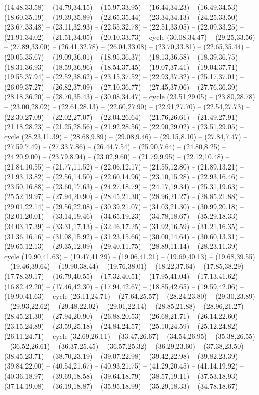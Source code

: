 {(14.48,33.58) -- (14.79,34.15) -- (15.97,33.95) -- (16.44,34.23) -- (16.49,34.53) -- (18.60,35.19) -- (19.39,35.89) -- (22.65,35.44) -- (23.34,34.13) -- (24.25,33.50) -- (23.67,33.48) -- (23.11,32.93) -- (22.55,32.78) -- (22.51,33.05) -- (22.09,33.25) -- (21.91,34.02) -- (21.51,34.05) -- (20.10,33.73) -- cycle (30.08,34.47) -- (29.25,33.56) -- (27.89,33.00) -- (26.41,32.78) -- (26.04,33.08) -- (23.70,33.81) -- (22.65,35.44) -- (20.05,35.67) -- (19.09,36.01) -- (18.95,36.37) -- (18.13,36.58) -- (18.39,36.75) -- (18.31,36.93) -- (18.59,36.96) -- (18.54,37.45) -- (19.07,37.41) -- (19.04,37.71) -- (19.55,37.94) -- (22.52,38.62) -- (23.15,37.52) -- (22.93,37.32) -- (25.17,37.01) -- (26.09,37.27) -- (26.82,37.09) -- (27.10,36.77) -- (27.45,37.06) -- (27.76,36.39) -- (28.18,36.20) -- (28.70,35.43) -- (30.08,34.47) -- cycle (23.51,29.05) -- (23.80,28.78) -- (23.00,28.02) -- (22.61,28.13) -- (22.60,27.90) -- (22.91,27.70) -- (22.54,27.73) -- (22.30,27.09) -- (22.02,27.07) -- (22.04,26.64) -- (21.76,26.61) -- (21.49,27.91) -- (21.18,28.23) -- (21.25,28.56) -- (21.92,28.56) -- (22.90,29.02) -- (23.51,29.05) -- cycle (28.23,11.39) -- (28.68,9.89) -- (29.08,9.46) -- (29.15,8.10) -- (27.84,7.47) -- (27.59,7.49) -- (27.33,7.86) -- (26.44,7.54) -- (25.90,7.64) -- (24.80,8.25) -- (24.20,9.00) -- (23.79,8.94) -- (23.02,9.60) -- (21.79,9.95) -- (22.12,10.48) -- (21.84,10.55) -- (21.77,11.52) -- (22.06,12.17) -- (21.55,12.80) -- (21.89,13.21) -- (21.93,13.82) -- (22.56,14.50) -- (22.60,14.96) -- (23.10,15.28) -- (22.93,16.46) -- (23.50,16.88) -- (23.60,17.63) -- (24.27,18.79) -- (24.17,19.34) -- (25.31,19.63) -- (25.52,19.97) -- (27.94,20.90) -- (28.45,21.30) -- (28.96,21.27) -- (28.85,21.88) -- (29.01,22.14) -- (29.56,22.08) -- (30.39,21.07) -- (31.03,21.30) -- (30.99,20.18) -- (32.01,20.01) -- (33.14,19.46) -- (34.65,19.23) -- (34.78,18.67) -- (35.29,18.33) -- (34.03,17.39) -- (33.31,17.13) -- (32.46,17.25) -- (31.92,16.59) -- (31.21,16.35) -- (31.36,16.16) -- (31.08,15.92) -- (31.23,15.66) -- (30.00,14.64) -- (30.60,13.31) -- (29.65,12.13) -- (29.35,12.09) -- (29.40,11.75) -- (28.89,11.14) -- (28.23,11.39) -- cycle (19.90,41.63) -- (19.47,41.29) -- (19.06,41.21) -- (19.69,40.13) -- (19.68,39.55) -- (19.46,39.64) -- (19.90,38.44) -- (19.76,38.01) -- (18.22,37.64) -- (17.85,38.29) -- (17.78,39.17) -- (16.79,40.55) -- (17.32,40.51) -- (17.95,41.04) -- (17.13,41.62) -- (16.82,42.20) -- (17.46,42.30) -- (17.94,42.67) -- (18.85,42.65) -- (19.59,42.06) -- (19.90,41.63) -- cycle (26.11,24.71) -- (27.64,25.57) -- (28.24,23.80) -- (29.30,23.89) -- (29.93,22.62) -- (29.48,22.02) -- (29.01,22.14) -- (28.85,21.88) -- (28.96,21.27) -- (28.45,21.30) -- (27.94,20.90) -- (26.88,20.53) -- (26.68,21.71) -- (26.14,22.60) -- (23.15,24.89) -- (23.59,25.18) -- (24.84,24.57) -- (25.10,24.59) -- (25.12,24.82) -- (26.11,24.71) -- cycle (32.69,26.11) -- (33.47,26.67) -- (34.54,26.95) -- (35.38,26.55) -- (36.52,26.61) -- (36.37,25.45) -- (36.57,25.32) -- (36.29,23.60) -- (37.38,23.50) -- (38.45,23.71) -- (38.70,23.19) -- (39.07,22.98) -- (39.42,22.98) -- (39.82,23.39) -- (39.84,22.00) -- (40.54,21.67) -- (40.93,21.75) -- (41.29,20.45) -- (41.14,19.92) -- (40.36,18.97) -- (39.69,18.58) -- (39.64,18.79) -- (38.57,19.11) -- (37.53,18.93) -- (37.14,19.08) -- (36.19,18.87) -- (35.95,18.99) -- (35.29,18.33) -- (34.78,18.67) }
